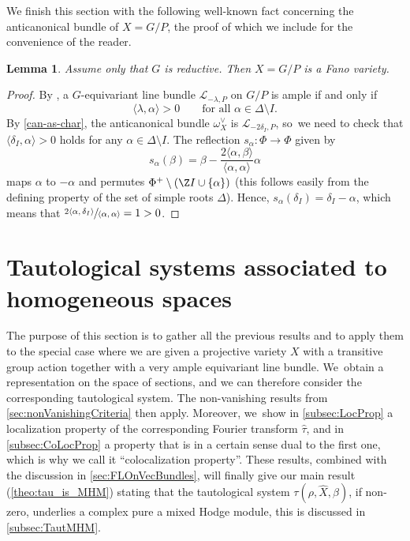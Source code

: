 \documentclass[JEP,XML,SOM,Unicode,published]{cedram}
\newtheorem{lem}[thm]{Lemma}
\newcommand{\Ell}{\mathscr{L}}
\begin{document}
We finish this section with the following well-known fact concerning the anticanonical bundle of $X=G/P$, the proof of which we include for the convenience of the reader.

\begin{lem}\label{lem:Fano}
Assume only that $G$ is reductive. Then $X=G/P$ is a Fano variety.
\end{lem}

\begin{proof}
By \cite[II.4.4]{Jantzen}, a $G$-equivariant line bundle $\Ell_{-\lambda,P}$ on $G/P$ is ample if and only if
\[
\langle \lambda, \alpha \rangle > 0 \qquad \text{for all $\alpha \in \Delta \setminus I$}.
\]
By \cref{can-as-char}, the anticanonical bundle $\omega_X^{\vee}$ is $\Ell_{-2\delta_I,P}$, so~we need to check that $\langle \delta_I, \alpha \rangle > 0$ holds for any $\alpha \in \Delta \setminus I$. The reflection $s_\alpha \colon \Phi \to \Phi$ given by
\[
s_\alpha(\beta) = \beta-\frac{2\langle \alpha, \beta \rangle}{\langle \alpha, \alpha \rangle} \alpha
\]
maps $\alpha$ to $-\alpha$ and permutes $\Phi^+ \setminus (\Z I \cup \{\alpha\})$ (this follows easily from the defining property of the set of simple roots $\Delta$). Hence, $s_\alpha(\delta_I) = \delta_I - \alpha$, which means that $\sfrac{2\langle \alpha, \delta_I\rangle}{\langle \alpha, \alpha \rangle} = 1 > 0$.
\end{proof}

\section{Tautological systems associated to homogeneous spaces} \label{sec:tautologicalSystems}

The purpose of this section is to gather all the previous results and to apply them to the special case where we are given a projective variety $X$ with a transitive group action together with a very ample equivariant line bundle. We~obtain a representation on the space of sections, and we can therefore consider the corresponding tautological system. The non-vanishing results from \cref{sec:nonVanishingCriteria} then apply. Moreover, we~show in \cref{subsec:LocProp} a localization property of the corresponding Fourier transform $\hat{\tau}$, and in \cref{subsec:CoLocProp} a property that is in a certain sense dual to the first one, which is why we call it ``colocalization property''. These results, combined with the discussion in \cref{sec:FLOnVecBundles}, will finally give our main result
(\cref{theo:tau_is_MHM}) stating that the tautological system $\tau(\rho,\hat{X},\beta)$, if non-zero, underlies a complex pure \resp a mixed Hodge module, this is discussed in \cref{subsec:TautMHM}.
\end{document}
